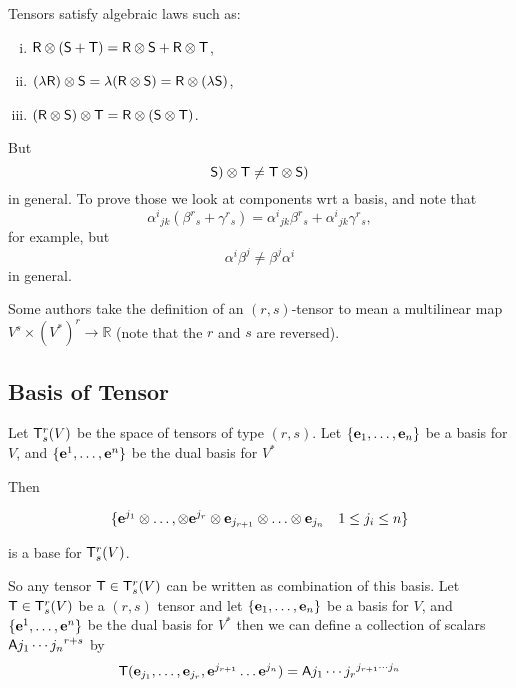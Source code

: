 Tensors satisfy algebraic laws such as:
\begin{enumerate}[(i)]
\item
$\mathsf{\mathsf{R}} \otimes (\mathsf{S}+\mathsf{T}) = \mathsf{R} \otimes \mathsf{S} + \mathsf{R} \otimes \mathsf{T}$,
\item
$(\lambda \mathsf{R}) \otimes \mathsf{S} = \lambda(\mathsf{R} \otimes \mathsf{S}) = \mathsf{R} \otimes (\lambda \mathsf{S})$,
\item
$(\mathsf{R} \otimes \mathsf{S}) \otimes \mathsf{T} = \mathsf{R} \otimes (\mathsf{S} \otimes \mathsf{T})$.
\end{enumerate}
But
\[
\mathsf{S}) \otimes \mathsf{T} \not= \mathsf{T} \otimes \mathsf{S}) 
\]
in general. To prove those we look at components wrt a basis, and note
that
\[
\alpha^i{}_{jk}(\beta^r{}_s +\gamma^r{}_s) =
\alpha^i{}_{jk}\beta^r{}_s + \alpha^i{}_{jk}\gamma^r{}_s,
\]
for example, but
\[
\alpha^i\beta^j \not= \beta^j\alpha^i 
\]
in general.



Some authors take the definition of an $(r,s)$-tensor to mean a multilinear map $V^s \times (V^*)^r \to \mathbb{R}$ (note that the $r$ and $s$ are reversed).  




\subsection{Basis of Tensor}

\begin{thm}
Let $\mathsf{T}^r_s(V)$ be the space of tensors of type $(r,s)$. Let 
\(\{\mathbf{ e}_{1},\ldots,\mathbf{ e}_{n}\}\) be a basis for $V$, and 
\(\{\mathbf{ e}^{1},\ldots,\mathbf{ e}^{n}\}\) be the dual basis for $V^*$

Then 

\[\{\mathbf{ e}^{j_1}\otimes \ldots, \otimes \mathbf{ e}^{j_r} \otimes \mathbf{ e}_{j_{r+1}} \otimes \ldots \otimes  \mathbf{ e}_{j_n} \quad 1\leq j_i\leq n \}\]

is a base for $\mathsf{T}^r_s(V)$.
\end{thm}

So any tensor $\mathsf{T} \in \mathsf{T}^r_s(V)$ can be written as combination of this basis.
Let  $\mathsf{T}\in \mathsf{T}^r_s(V)$
be   a $(r,s)$ tensor  and let 
\(\{\mathbf{ e}_{1},\ldots,\mathbf{ e}_{n}\}\) be a basis for $V$, and 
\(\{\mathbf{ e}^{1},\ldots,\mathbf{ e}^{n}\}\) be the dual basis for $V^*$
then we can define a collection of scalars
\(\mathsf{A}{j_1\cdots j_n}^{r+s}\) by
\[\mathsf{T}(\mathbf{ e}_{j_1},\ldots,\mathbf{ e}_{j_r}, \mathbf{ e}^{j_{r+1}}\ldots \mathbf{ e}^{j_n}) = \mathsf{A}{j_1\cdots j_r} ^{j_{r+1}\cdots j_n}\]

